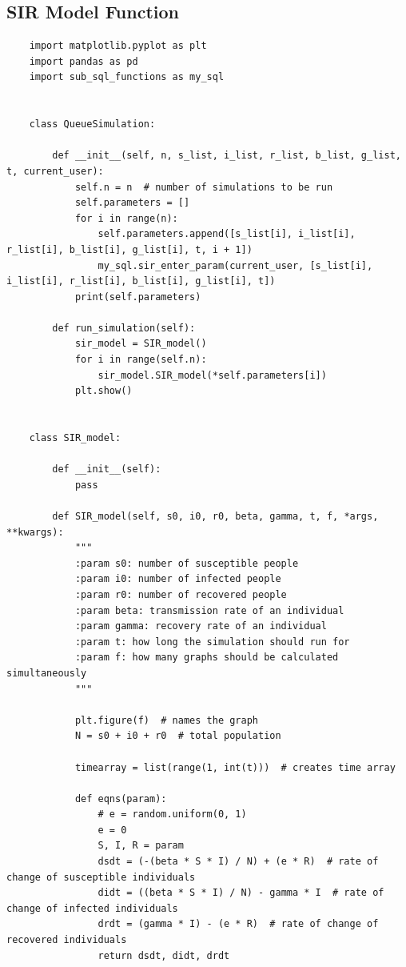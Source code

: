 \documentclass[11pt, a4paper]{article}
\begin{document}
\subsection{SIR Model Function}
\begin{lstlisting}
    import matplotlib.pyplot as plt
    import pandas as pd
    import sub_sql_functions as my_sql
    
    
    class QueueSimulation:
    
        def __init__(self, n, s_list, i_list, r_list, b_list, g_list, t, current_user):
            self.n = n  # number of simulations to be run
            self.parameters = []
            for i in range(n):
                self.parameters.append([s_list[i], i_list[i], r_list[i], b_list[i], g_list[i], t, i + 1])
                my_sql.sir_enter_param(current_user, [s_list[i], i_list[i], r_list[i], b_list[i], g_list[i], t])
            print(self.parameters)
    
        def run_simulation(self):
            sir_model = SIR_model()
            for i in range(self.n):
                sir_model.SIR_model(*self.parameters[i])
            plt.show()
    
    
    class SIR_model:
    
        def __init__(self):
            pass
    
        def SIR_model(self, s0, i0, r0, beta, gamma, t, f, *args, **kwargs):
            """
            :param s0: number of susceptible people
            :param i0: number of infected people
            :param r0: number of recovered people
            :param beta: transmission rate of an individual
            :param gamma: recovery rate of an individual
            :param t: how long the simulation should run for
            :param f: how many graphs should be calculated simultaneously
            """
    
            plt.figure(f)  # names the graph
            N = s0 + i0 + r0  # total population
    
            timearray = list(range(1, int(t)))  # creates time array
    
            def eqns(param):
                # e = random.uniform(0, 1)
                e = 0
                S, I, R = param
                dsdt = (-(beta * S * I) / N) + (e * R)  # rate of change of susceptible individuals
                didt = ((beta * S * I) / N) - gamma * I  # rate of change of infected individuals
                drdt = (gamma * I) - (e * R)  # rate of change of recovered individuals
                return dsdt, didt, drdt
    

\end{lstlisting}
\end{document}

